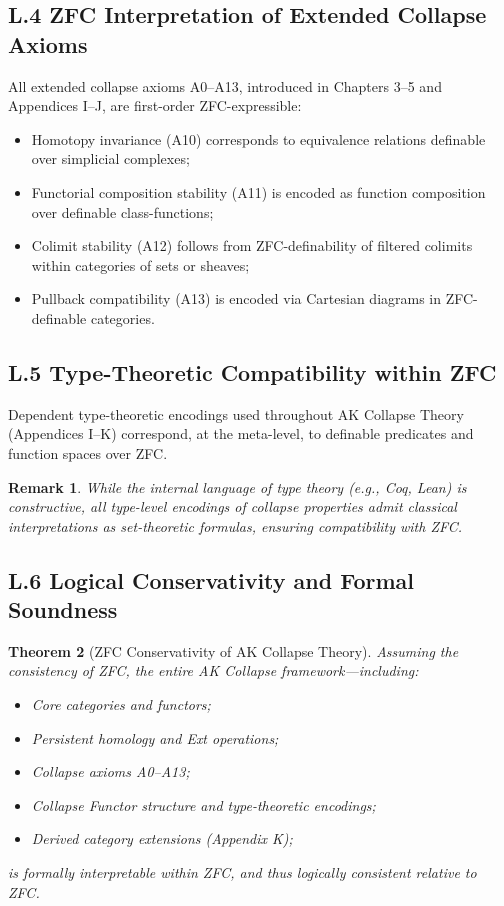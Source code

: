 \documentclass[11pt]{article}
\newtheorem{theorem}{Theorem}[section]
\newtheorem{remark}[theorem]{Remark}
\begin{document}
\subsection*{L.4 ZFC Interpretation of Extended Collapse Axioms}

All extended collapse axioms A0–A13, introduced in Chapters 3–5 and Appendices I–J, are first-order ZFC-expressible:

\begin{itemize}
    \item Homotopy invariance (A10) corresponds to equivalence relations definable over simplicial complexes;
    \item Functorial composition stability (A11) is encoded as function composition over definable class-functions;
    \item Colimit stability (A12) follows from ZFC-definability of filtered colimits within categories of sets or sheaves;
    \item Pullback compatibility (A13) is encoded via Cartesian diagrams in ZFC-definable categories.
\end{itemize}

\subsection*{L.5 Type-Theoretic Compatibility within ZFC}

Dependent type-theoretic encodings used throughout AK Collapse Theory (Appendices I–K) correspond, at the meta-level, to definable predicates and function spaces over ZFC.

\begin{remark}
While the internal language of type theory (e.g., Coq, Lean) is constructive, all type-level encodings of collapse properties admit classical interpretations as set-theoretic formulas, ensuring compatibility with ZFC.
\end{remark}

\subsection*{L.6 Logical Conservativity and Formal Soundness}

\begin{theorem}[ZFC Conservativity of AK Collapse Theory]
Assuming the consistency of ZFC, the entire AK Collapse framework—including:

\begin{itemize}
    \item Core categories and functors;
    \item Persistent homology and Ext operations;
    \item Collapse axioms A0–A13;
    \item Collapse Functor structure and type-theoretic encodings;
    \item Derived category extensions (Appendix K);
\end{itemize}

is formally interpretable within ZFC, and thus logically consistent relative to ZFC.
\end{theorem}
\end{document}
